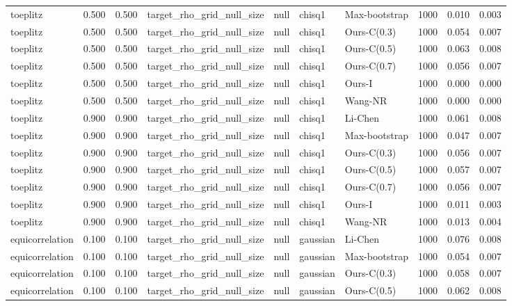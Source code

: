 \begin{tabular}{lrrllllrrr}
toeplitz & 0.500 & 0.500 & target\_rho\_grid\_null\_size & null & chisq1 & Max-bootstrap & 1000 & 0.010 & 0.003 \\
toeplitz & 0.500 & 0.500 & target\_rho\_grid\_null\_size & null & chisq1 & Ours-C(0.3) & 1000 & 0.054 & 0.007 \\
toeplitz & 0.500 & 0.500 & target\_rho\_grid\_null\_size & null & chisq1 & Ours-C(0.5) & 1000 & 0.063 & 0.008 \\
toeplitz & 0.500 & 0.500 & target\_rho\_grid\_null\_size & null & chisq1 & Ours-C(0.7) & 1000 & 0.056 & 0.007 \\
toeplitz & 0.500 & 0.500 & target\_rho\_grid\_null\_size & null & chisq1 & Ours-I & 1000 & 0.000 & 0.000 \\
toeplitz & 0.500 & 0.500 & target\_rho\_grid\_null\_size & null & chisq1 & Wang-NR & 1000 & 0.000 & 0.000 \\
toeplitz & 0.900 & 0.900 & target\_rho\_grid\_null\_size & null & chisq1 & Li-Chen & 1000 & 0.061 & 0.008 \\
toeplitz & 0.900 & 0.900 & target\_rho\_grid\_null\_size & null & chisq1 & Max-bootstrap & 1000 & 0.047 & 0.007 \\
toeplitz & 0.900 & 0.900 & target\_rho\_grid\_null\_size & null & chisq1 & Ours-C(0.3) & 1000 & 0.056 & 0.007 \\
toeplitz & 0.900 & 0.900 & target\_rho\_grid\_null\_size & null & chisq1 & Ours-C(0.5) & 1000 & 0.057 & 0.007 \\
toeplitz & 0.900 & 0.900 & target\_rho\_grid\_null\_size & null & chisq1 & Ours-C(0.7) & 1000 & 0.056 & 0.007 \\
toeplitz & 0.900 & 0.900 & target\_rho\_grid\_null\_size & null & chisq1 & Ours-I & 1000 & 0.011 & 0.003 \\
toeplitz & 0.900 & 0.900 & target\_rho\_grid\_null\_size & null & chisq1 & Wang-NR & 1000 & 0.013 & 0.004 \\
equicorrelation & 0.100 & 0.100 & target\_rho\_grid\_null\_size & null & gaussian & Li-Chen & 1000 & 0.076 & 0.008 \\
equicorrelation & 0.100 & 0.100 & target\_rho\_grid\_null\_size & null & gaussian & Max-bootstrap & 1000 & 0.054 & 0.007 \\
equicorrelation & 0.100 & 0.100 & target\_rho\_grid\_null\_size & null & gaussian & Ours-C(0.3) & 1000 & 0.058 & 0.007 \\
equicorrelation & 0.100 & 0.100 & target\_rho\_grid\_null\_size & null & gaussian & Ours-C(0.5) & 1000 & 0.062 & 0.008 \\

\end{tabular}
